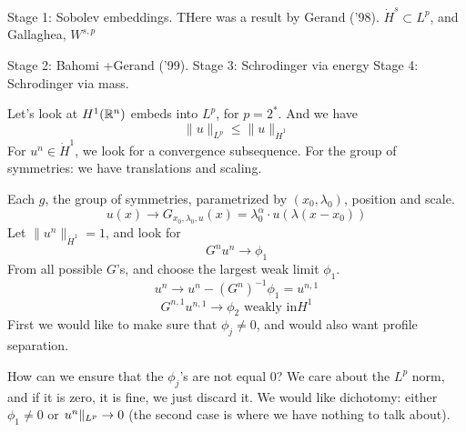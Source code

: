 Stage 1: Sobolev embeddings. THere was a result by Gerand ('98). $\dot{H}^s\subset L^p$, and Gallaghea, $W^{s,p}$

Stage 2: Bahomi +Gerand ('99).
Stage 3: Schrodinger via energy
Stage 4: Schrodinger via mass.

Let's look at $H^1(\mathbb{R}^n)$ embeds into $L^p$, for $p=2^*$. And we have
\begin{equation*}
    \|u\|_{L^p}\leq\|u\|_{\dot{H}^1}
\end{equation*}
For $u^n\in\dot{H}^1$, we look for a convergence subsequence. For the group of symmetries: we have translations and scaling.

Each $g$, the group of symmetries, parametrized by $(x_0,\lambda_0)$, position and scale.
\begin{equation*}
    u(x)\to G_{x_0, \lambda_0, u}(x)=\lambda_0^\alpha\cdot u(\lambda(x-x_0))
\end{equation*}
Let $\|u^n\|_{\dot{H}^1}=1$, and look for
\begin{equation*}
    G^nu^n\to\phi_1
\end{equation*}
From all possible $G$'s, and choose the largest weak limit $\phi_1$.
\begin{equation*}
    u^n\to u^n-(G^n)^{-1}\phi_1=u^{n,1}
\end{equation*}
\begin{equation*}
    G^{n,1}u^{n,1}\to \phi_2 \text{ weakly in} H^1
\end{equation*}
First we would like to make sure that $\phi_j\neq 0$, and would also want profile separation.

How can we ensure that the $\phi_j$'s are not equal 0? We care about the $L^p$ norm, and if it is zero, it is fine, we just discard it. We would like dichotomy: either $\phi_1\neq 0$ or $\\u^n\|_{L^p}\to 0$ (the second case is where we have nothing to talk about).

